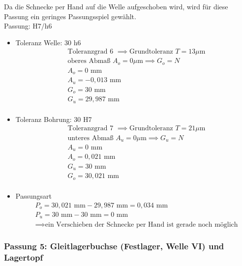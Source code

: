 Da die Schnecke per Hand auf die Welle aufgeschoben wird, wird für diese Passung ein geringes Passungsspiel gewählt. \\ 
Passung: H7/h6
\begin{itemize}
	\item Toleranz Welle: 30 h6
	\begin{align*}
	&\text{Toleranzgrad 6 } \implies \text{Grundtoleranz } T=13 \mu\text{m} \\
	&\text{oberes Abmaß } A_o = 0\mu\text{m} \implies G_o = N\\
	&A_o = 0 \text{ mm} \\
	&A_u = -0,013 \text{ mm} \\
	&G_o = 30 \text{ mm} \\
	&G_u = 29,987 \text{ mm}\\
	\end{align*} 
	\item Toleranz Bohrung: 30 H7
	\begin{align*}
	&\text{Toleranzgrad 7 } \implies \text{Grundtoleranz } T=21 \mu\text{m} \\
	&\text{unteres Abmaß } A_u = 0 \mu\text{m} \implies G_u = N\\
	&A_u = 0 \text{ mm} \\
	&A_o = 0,021 \text{ mm} \\
	&G_u = 30 \text{ mm} \\
	&G_o = 30,021 \text{ mm}\\
	\end{align*} 
	\item Passungsart
	\begin{align*}
	&P_o = 30,021 \text{ mm} - 29,987 \text{ mm} = 0,034 \text{ mm} \\
	&P_u = 30 \text{ mm} - 30 \text{ mm} =0 \text{ mm}\\
	&\implies \text{ein Verschieben der Schnecke per Hand ist gerade noch möglich}
	\end{align*} 
\end{itemize}
\newpage

\subsubsection{Passung 5: Gleitlagerbuchse (Festlager, Welle VI) und Lagertopf}

